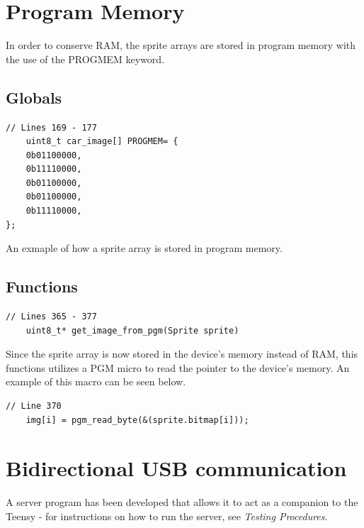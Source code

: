 \documentclass{article}
\begin{document}
\clearpage

\section{Program Memory}
In order to conserve RAM, the sprite arrays are stored in program memory with the use of the PROGMEM keyword. 

\subsection*{Globals}
\begin{lstlisting}[style=CStyle]
	// Lines 169 - 177
	uint8_t car_image[] PROGMEM= {
    0b01100000,
    0b11110000,
    0b01100000,
    0b01100000,
    0b11110000,
};
\end{lstlisting}
An exmaple of how a sprite array is stored in program memory.
\newline

\subsection*{Functions}
\begin{lstlisting}[style=CStyle]
	// Lines 365 - 377
	uint8_t* get_image_from_pgm(Sprite sprite)
\end{lstlisting}
Since the sprite array is now stored in the device's memory instead of RAM, this functions utilizes a PGM micro to read the pointer to the device's memory. An example of this macro can be seen below.
\begin{lstlisting}[style=CStyle]
	// Line 370
	img[i] = pgm_read_byte(&(sprite.bitmap[i]));
\end{lstlisting}

\clearpage

\section{Bidirectional USB communication}
A server program has been developed that allows it to act as a companion to the Teensy - for instructions on how to run the server, see \emph{Testing Procedures}. 
\end{document}
